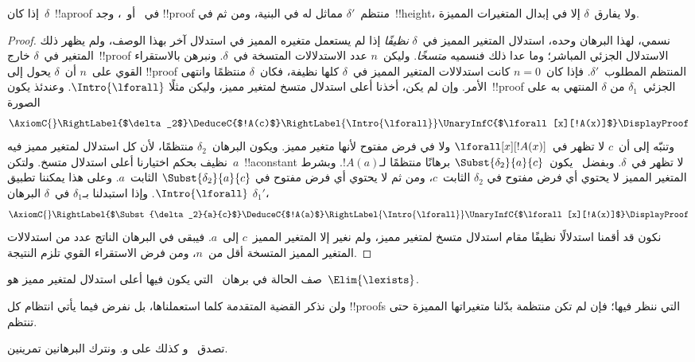 \documentclass[../../../include/open-logic-section]{subfiles}
\begin{document}
\begin{prop}
إذا كان~$\delta$~!!a{proof} في~ أو~، وجد
!!{proof} منتظم~$\delta'$ مماثل له في البنية، ومن ثم في~!!{height}، ولا
يفارق~$\delta$ إلا في إبدال المتغيرات المميزة.
\end{prop}

\begin{proof}
نسمي، لهذا البرهان وحده، استدلال المتغير المميز في~$\delta$
\emph{نظيفًا} إذا لم يستعمل متغيره المميز في استدلال آخر بهذا الوصف،
ولم يظهر ذلك المتغير في~$\delta$ خارج~!!{proof} الاستدلال الجزئي
المباشر؛ وما عدا ذلك فنسميه \emph{متسخًا}. وليكن~$n$ عدد الاستدلالات
المتسخة في~$\delta$. ونبرهن بالاستقراء القوي على~$n$ أن~$\delta$ يحول إلى
!!{proof} المنتظم المطلوب~$\delta'$. فإذا كان~$n=0$ كانت استدلالات
المتغير المميز في~$\delta$ كلها نظيفة، فكان~$\delta$ منتظمًا وانتهى
الأمر. وإن لم يكن، أخذنا أعلى استدلال متسخ لمتغير مميز، وليكن مثلًا
$\Intro{\lforall}$. وعندئذ يكون~!!{proof} الجزئي~$\delta_1$ من
$\delta$ المنتهي به على الصورة
    \[
    \AxiomC{}
    \RightLabel{$\delta_2$}
    \DeduceC{$!A(c)$}
    \RightLabel{\Intro{\lforall}}
    \UnaryInfC{$\lforall[x][!A(x)]$}
    \DisplayProof
    \]
وتنبّه إلى أن~$c$ لا تظهر في~$\lforall[x][!A(x)]$ ولا في فرض مفتوح لأنها
متغير مميز. ويكون البرهان~$\delta_2$ منتظمًا، لأن كل استدلال لمتغير
مميز فيه نظيف بحكم اختيارنا أعلى استدلال متسخ. ولتكن~$a$~!!a{constant}
لا تظهر في~$\delta$.
وبفضل~ يكون~$\Subst{\delta_2}{a}{c}$ برهانًا
منتظمًا لـ$!A(a)$. وبشرط المتغير المميز لا يحتوي أي فرض مفتوح في
$\delta_2$ الثابت~$c$، ومن ثم لا يحتوي أي فرض مفتوح في
$\Subst{\delta_2}{a}{c}$ الثابت~$a$. وعلى هذا يمكننا تطبيق
$\Intro{\lforall}$. وإذا استبدلنا بـ$\delta_1$ في~$\delta$ البرهان
$\delta_1'$،
    \[
    \AxiomC{}
    \RightLabel{$\Subst{\delta_2}{a}{c}$}
    \DeduceC{$!A(a)$}
    \RightLabel{\Intro{\lforall}}
    \UnaryInfC{$\lforall[x][!A(x)]$}
    \DisplayProof
    \]
نكون قد أقمنا استدلالًا نظيفًا مقام استدلال متسخ لمتغير مميز، ولم نغير
إلا المتغير المميز~$c$ إلى~$a$. فيبقى في البرهان الناتج عدد من
استدلالات المتغير المميز المتسخة أقل من~$n$، ومن فرض الاستقراء القوي
تلزم النتيجة.
\end{proof}

\begin{prob}
صف الحالة في برهان~ التي يكون فيها أعلى استدلال
لمتغير مميز هو~$\Elim{\lexists}$.
\end{prob}

ولن نذكر القضية المتقدمة كلما استعملناها، بل نفرض فيما يأتي انتظام كل
!!{proof}s التي ننظر فيها؛ فإن لم تكن منتظمة بدّلنا متغيراتها المميزة
حتى تنتظم.

تصدق~ و كذلك على
 و. ونترك البرهانين تمرينين.
\end{document}
